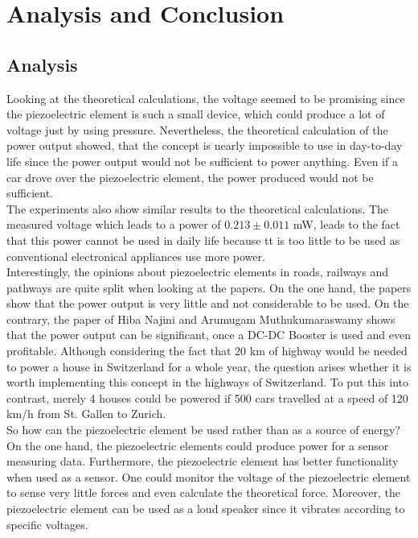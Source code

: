 \chapter{Analysis and Conclusion}

\section{Analysis}

Looking at the theoretical calculations, the voltage seemed to be promising since the piezoelectric element is such a small device, which could produce a lot of voltage just by using pressure. Nevertheless, the theoretical calculation of the power output showed, that the concept is nearly impossible to use in day-to-day life since the power output would not be sufficient to power anything. Even if a car drove over the piezoelectric element, the power produced would not be sufficient. \\ 
The experiments also show similar results to the theoretical calculations. The measured voltage which leads to a power of $0.213 \pm 0.011$ mW, leads to the fact that this power cannot be used in daily life because tt is too little to be used as conventional electronical appliances use more power.\\
Interestingly, the opinions about piezoelectric elements in roads, railways and pathways are quite split when looking at the papers. On the one hand, the papers show that the power output is very little and not considerable to be used. On the contrary, the paper of Hiba Najini and Arumugam Muthukumaraswamy shows that the power output can be significant, once a DC-DC  Booster is used and even profitable. Although considering the fact that 20 km of highway would be needed to power a house in Switzerland for a whole year, the question arises whether it is worth implementing this concept in the highways of Switzerland. To put this into contrast, merely 4 houses could be powered if 500 cars travelled at a speed of 120 km/h from St. Gallen to Zurich.\\
So how can the piezoelectric element be used rather than as a source of energy? On the one hand, the piezoelectric elements could produce power for a sensor measuring data. Furthermore, the piezoelectric element has better functionality when used as a sensor. One could monitor the voltage of the piezoelectric element to sense very little forces and even calculate the theoretical force. Moreover, the piezoelectric element can be used as a loud speaker since it vibrates according to specific voltages.\\